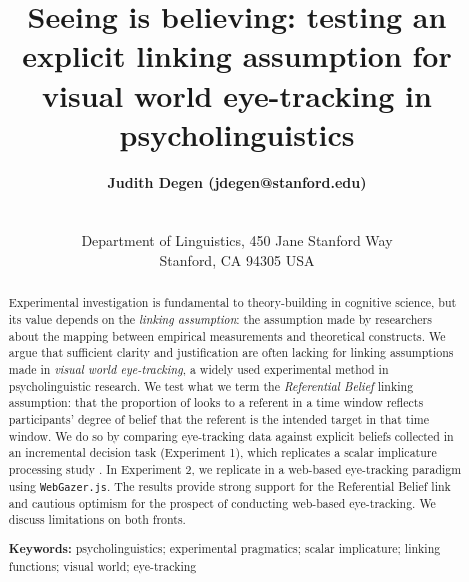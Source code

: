 \documentclass[10pt,letterpaper]{article}
\title{Seeing is believing: testing an explicit linking assumption for visual world eye-tracking in psycholinguistics}
\author{{\large \bf Judith Degen (jdegen@stanford.edu)} \\
  \AND {\large \bf Leyla Kursat (lkursat@stanford.edu)} \\
  \AND {\large \bf Daisy Leigh (ddleigh@stanford.edu)} \\
  Department of Linguistics, 450 Jane Stanford Way \\
  Stanford, CA 94305 USA}
\newcommand{\expref}[1]{Experiment #1}
\begin{document}
\maketitle


\begin{abstract}
Experimental investigation is fundamental to theory-building in cognitive science, but its value depends on the \emph{linking assumption}: the assumption made by researchers about the mapping between empirical measurements and theoretical constructs. We argue that sufficient clarity and justification are often lacking for linking assumptions made in \emph{visual world eye-tracking}, a widely used experimental method in psycholinguistic research. 
We test what we term the \emph{Referential Belief} linking assumption: that the proportion of looks to a referent in a time window reflects participants' degree of belief that the referent is the intended target in that time window. We do so by comparing eye-tracking data against explicit beliefs collected in an incremental decision task (\expref{1}), which replicates a scalar implicature processing study \cite<\expref{3} of>{sun2020}.  In \expref{2}, we replicate  in a web-based eye-tracking paradigm using \texttt{WebGazer.js}. The results provide strong support for the Referential Belief link and cautious optimism for the prospect of conducting web-based eye-tracking. We discuss limitations on both fronts.

\textbf{Keywords:} 
psycholinguistics; experimental pragmatics;  scalar implicature; linking functions; visual world; eye-tracking
\end{abstract}

\end{document}
